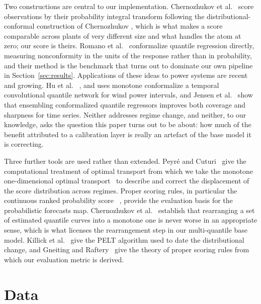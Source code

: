 \documentclass[preprint,3p,times]{elsarticle}
\providecommand{\DIFaddtex}[1]{{\protect\color{blue} \sf #1}} %
\providecommand{\DIFdeltex}[1]{{\protect\color{red} \scriptsize #1}} %
\providecommand{\DIFaddbegin}{} %
\providecommand{\DIFaddend}{} %
\providecommand{\DIFdelbegin}{} %
\providecommand{\DIFdelend}{} %
\providecommand{\DIFadd}[1]{\texorpdfstring{\DIFaddtex{#1}}{#1}} %
\providecommand{\DIFdel}[1]{\texorpdfstring{\DIFdeltex{#1}}{}} %
\begin{document}
\DIFadd{Two constructions are central to our implementation. Chernozhukov et al.~\cite{chernozhukov2021} score }\DIFaddend observations by their probability integral transform\DIFdelbegin \DIFdel{following the distributional-conformal construction of Chernozhukov }\DIFdelend \DIFaddbegin \DIFadd{, which is what makes a score comparable across plants of very different size and what handles the atom at zero; our score is theirs. Romano et al.~\cite{romano2019} conformalize quantile regression directly, measuring nonconformity in the units of the response rather than in probability, and their method is the benchmark that turns out to dominate our own pipeline in Section~\ref{sec:results}. Applications of these ideas to power systems are recent and growing. Hu }\DIFaddend et al.~\DIFdelbegin \DIFdel{\cite{chernozhukov2021}, and uses monotone }\DIFdelend \DIFaddbegin \DIFadd{\cite{hu2022} conformalize a temporal convolutional quantile network for wind power intervals, and Jensen et al.~\cite{jensen2024} show that ensembling conformalized quantile regressors improves both coverage and sharpness for time series. Neither addresses regime change, and neither, to our knowledge, asks the question this paper turns out to be about: how much of the benefit attributed to a calibration layer is really an artefact of the base model it is correcting.
}

\DIFadd{Three further tools are used rather than extended. Peyr\'e and Cuturi~\cite{peyre2019} give the computational treatment of optimal transport from which we take the monotone }\DIFaddend one-dimensional \DIFdelbegin \DIFdel{optimal transport~\cite{peyre2019} to describe and correct the displacement of the score distribution across regimes. Proper scoring rules, in particular the continuous ranked probability score~\cite{gneiting2007} , provide the evaluation basis for the probabilistic forecasts}\DIFdelend \DIFaddbegin \DIFadd{map. Chernozhukov et al.~\cite{chernozhukov2010} establish that rearranging a set of estimated quantile curves into a monotone one is never worse in an appropriate sense, which is what licenses the rearrangement step in our multi-quantile base model. Killick et al.~\cite{killick2012} give the PELT algorithm used to date the distributional change, and Gneiting and Raftery~\cite{gneiting2007} give the theory of proper scoring rules from which our evaluation metric is derived}\DIFaddend .

\section{Data}
\label{sec:data}
\end{document}
